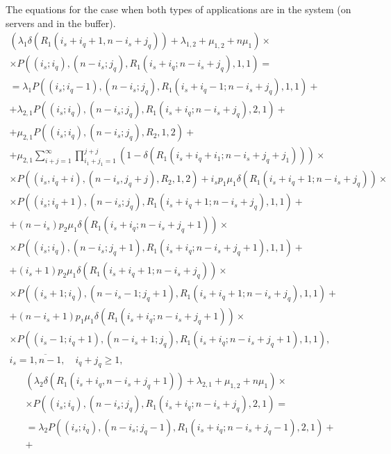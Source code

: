 {The equations for the case when both types of applications are in the
system (on servers and in the buffer).
\begin{multline}
  \left(\lambda_1 \delta\left(R_1(i_s+i_q+1,n-i_s+j_q)\right)+\lambda_{1,2}+\mu_{1,2}+n\mu_1\right) \times \\
  \times P\left((i_s;i_q),(n-i_s;j_q),R_1(i_s+i_q;
    n-i_s+j_q),1,1\right) = \\ = \lambda_1
  P\left((i_s;i_q-1),(n-i_s;j_q),R_1(i_s+i_q-1;n-i_s+j_q),1,1\right) +
  \\ + \lambda_{2,1} P\left((i_s;i_q),(n-i_s;j_q),R_1(i_s+i_q;
    n-i_s+j_q),2,1\right) + \\ + \mu_{2,1}
  P\left((i_s;i_q),(n-i_s;j_q),R_2,1,2\right) + \\ +
  \mu_{2,1} \sum\limits_{i+j=1}^{\infty}\prod\limits_{i_1+j_1=1}^{j+j}\left(1-\delta\left(R_1 (i_s+i_q+i_1;n-i_s+j_q+j_1) \right)\right) \times \\
  \times P\left((i_s,i_q+i),(n-i_s,j_q+j),R_2,1,2\right) +
  i_s p_1\mu_1\delta\left(R_1(i_s+i_q+1;n-i_s+j_q)\right) \times \\
  \times P\left((i_s;i_q+1),(n-i_s;j_q),R_1(i_s+i_q+1;
    n-i_s+j_q),1,1\right) + \\ +
  (n-i_s) p_2 \mu_1 \delta\left(R_1(i_s+i_q;n-i_s+j_q+1)\right) \times \\
  \times P\left((i_s;i_q),(n-i_s;j_q+1),R_1(i_s+i_q;
    n-i_s+j_q+1),1,1\right) + \\ +
  (i_s+1) p_2 \mu_1 \delta\left(R_1(i_s+i_q+1;n-i_s+j_q)\right)  \times \\
  \times P\left((i_s+1;i_q),(n-i_s-1;j_q+1),R_1(i_s+i_q+1;
    n-i_s+j_q),1,1\right) + \\ +
  (n-i_s+1) p_1\mu_1 \delta\left(R_1(i_s+i_q;n-i_s+j_q+1)\right) \times \\
  \times  P\left((i_s-1;i_q+1),(n-i_s+1;j_q),R_1(i_s+i_q; n-i_s+j_q+1),1,1\right), \\
  i_s=\overline{1,n-1}, \quad i_q+j_q\geqslant 1,
\label{eq:10.1}
\end{multline}
\begin{multline}
  \left(\lambda_2 \delta\left(R_1(i_s+i_q,n-i_s+j_q+1)\right)+\lambda_{2,1}+\mu_{1,2}+n\mu_1\right) \times \\
  \times  P\left((i_s;i_q),(n-i_s;j_q),R_1(i_s+i_q;
    n-i_s+j_q),2,1\right) = \\ =
  \lambda_2
  P\left((i_s;i_q),(n-i_s;j_q-1),R_1(i_s+i_q;n-i_s+j_q-1),2,1\right) +
  \\ +

\end{multline}}
